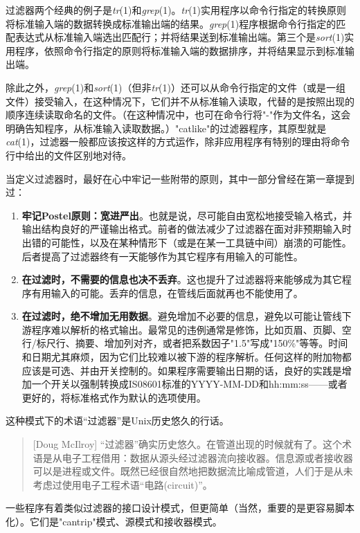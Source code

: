 \documentclass[12pt,oneside]{book}
\begin{document}
过滤器两个经典的例子是\textit{tr}(1)和\textit{grep}(1)。\textit{tr}(1)实用程序以命令行指定的转换原则将标准输入端的数据转换成标准输出端的结果。\textit{grep}(1)程序根据命令行指定的匹配表达式从标准输入端选出匹配行；并将结果送到标准输出端。第三个是\textit{sort}(1)实用程序，依照命令行指定的原则将标准输入端的数据排序，并将结果显示到标准输出端。

除此之外，\textit{grep}(1)和\textit{sort}(1)（但非\textit{tr}(1)）还可以从命令行指定的文件（或是一组文件）接受输入，在这种情况下，它们并不从标准输入读取，代替的是按照出现的顺序连续读取命名的文件。（在这种情况中，也可在命令行将"-"作为文件名，这会明确告知程序，从标准输入读取数据。）"catlike"的过滤器程序，其原型就是\textit{cat}(1)，过滤器一般都应该按这样的方式运作，除非应用程序有特别的理由将命令行中给出的文件区别地对待。

当定义过滤器时，最好在心中牢记一些附带的原则，其中一部分曾经在第一章提到过：
\begin{enumerate}
\item \textbf{牢记Postel原则：宽进严出}。也就是说，尽可能自由宽松地接受输入格式，并输出结构良好的严谨输出格式。前者的做法减少了过滤器在面对非预期输入时出错的可能性，以及在某种情形下（或是在某一工具链中间）崩溃的可能性。后者提高了过滤器终有一天能够作为其它程序有用输入的可能性。
\item \textbf{在过滤时，不需要的信息也决不丢弃}。这也提升了过滤器将来能够成为其它程序有用输入的可能。丢弃的信息，在管线后面就再也不能使用了。
\item \textbf{在过滤时，绝不增加无用数据}。避免增加不必要的信息，避免以可能让管线下游程序难以解析的格式输出。最常见的违例通常是修饰，比如页眉、页脚、空行/标尺行、摘要、增加列对齐，或者把系数因子"1.5"写成"150\%{}"等等。时间和日期尤其麻烦，因为它们比较难以被下游的程序解析。任何这样的附加物都应该是可选、并由开关控制的。如果程序需要输出日期的话，良好的实践是增加一个开关以强制转换成IS08601标准的YYYY-MM-DD和hh:mm:ss——或者更好的，将标准格式作为默认的选项使用。
\end{enumerate}

这种模式下的术语“过滤器”是Unix历史悠久的行话。

\begin{quote}[Doug McIlroy]
“过滤器”确实历史悠久。在管道出现的时候就有了。这个术语是从电子工程借用：数据从源头经过滤器流向接收器。信息源或者接收器可以是进程或文件。既然已经很自然地把数据流比喻成管道，人们于是从未考虑过使用电子工程术语“电路(circuit)”。
\end{quote}

一些程序有着类似过滤器的接口设计模式，但更简单（当然，重要的是更容易脚本化）。它们是"cantrip"模式、源模式和接收器模式。
\end{document}
